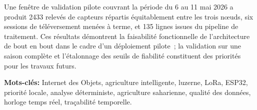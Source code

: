 Une fenêtre de validation pilote couvrant la période du 6 au 11 mai 2026 a produit
2433 relevés de capteurs répartis équitablement entre les trois nœuds, six sessions
de téléversement menées à terme, et 135 lignes issues du pipeline de traitement. Ces
résultats démontrent la faisabilité fonctionnelle de l'architecture de bout en bout
dans le cadre d'un déploiement pilote~; la validation sur une saison complète et
l'étalonnage des seuils de fiabilité constituent des priorités pour les travaux futurs.

\vspace{1em}
\noindent\textbf{Mots-clés:} Internet des Objets, agriculture intelligente, luzerne,
LoRa, ESP32, priorité locale, analyse déterministe, agriculture saharienne, qualité
des données, horloge temps réel, traçabilité temporelle.
